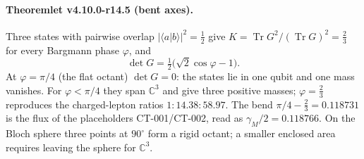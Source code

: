 \paragraph{Theoremlet v4.10.0-r14.5 (bent axes).}
Three states with pairwise overlap \(|\langle a|b\rangle|^2=\tfrac12\) give \(K=\operatorname{Tr}G^2/(\operatorname{Tr}G)^2=\tfrac23\)
for every Bargmann phase \(\varphi\), and
\[
\det G=\tfrac12\bigl(\sqrt2\cos\varphi-1\bigr).
\]
At \(\varphi=\pi/4\) (the flat octant) \(\det G=0\): the states lie in one qubit and one mass vanishes.  For \(\varphi<\pi/4\)
they span \(\mathbb C^3\) and give three positive masses; \(\varphi=\tfrac23\) reproduces the charged-lepton ratios
\(1:14.38:58.97\).  The bend \(\pi/4-\tfrac23=0.118731\) is the flux of the placeholders CT-001/CT-002, read as
\(\gamma_M/2=0.118766\).  On the Bloch sphere three points at \(90^\circ\) form a rigid octant; a smaller enclosed area requires
leaving the sphere for \(\mathbb C^3\).


